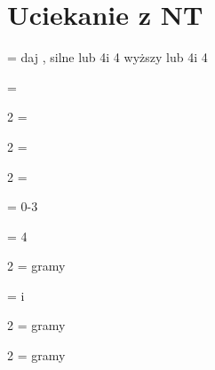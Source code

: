 \documentclass[12pt, a4paper]{article}
\begin{document}
\section*{Uciekanie z NT}
\compsequence{{1\ntx}{\dbl}}
\begin{compoptions}[3]
    \item[\pass] = daj \rdbl, silne lub 4\clubs i 4 wyższy lub 4\diams i 4\major
    \item[\rdbl] = \clubs
    \item[2\clubs] = \diams
    \item[2\diams] = \hearts
    \item[2\hearts] = \spades
\end{compoptions}


\begin{compoptions}[1]
    \item[\pass] = 0-3 \clubs
    \item[\rdbl] = 4 \clubs
    \item[2\clubs] = gramy
\end{compoptions}

\begin{compoptions}[3]
    \item[\rdbl] = \diams i \major
    \item[2\clubs] = gramy
    \item[2\diams] = gramy
\end{compoptions}
\end{document}
